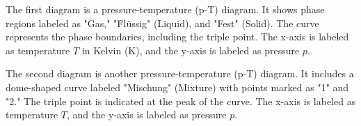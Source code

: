 The first diagram is a pressure-temperature (p-T) diagram. It shows phase regions labeled as "Gas," "Flüssig" (Liquid), and "Fest" (Solid). The curve represents the phase boundaries, including the triple point. The x-axis is labeled as temperature \( T \) in Kelvin (K), and the y-axis is labeled as pressure \( p \).  

The second diagram is another pressure-temperature (p-T) diagram. It includes a dome-shaped curve labeled "Mischung" (Mixture) with points marked as "1" and "2." The triple point is indicated at the peak of the curve. The x-axis is labeled as temperature \( T \), and the y-axis is labeled as pressure \( p \).